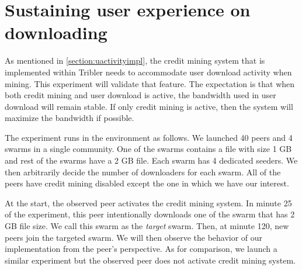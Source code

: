 \vspace{-0.3cm} 
\section{Sustaining user experience on downloading}
\label{section:expprio}
As mentioned in \ref{section:uactivityimpl}, the credit mining system that is implemented within Tribler needs to accommodate user download activity when mining. This experiment will validate that feature. The expectation is that when both credit mining and user download is active, the bandwidth used in user download will remain stable. If only credit mining is active, then the system will maximize the bandwidth if possible. 

The experiment runs in the environment as follows. We launched 40 peers and 4 swarms in a single community. One of the swarms contains a file with size 1 GB and rest of the swarms have a 2 GB file. Each swarm has 4 dedicated seeders. We then arbitrarily decide the number of downloaders for each swarm. All of the peers have credit mining disabled except the one in which we have our interest. 

At the start, the observed peer activates the credit mining system. In minute 25 of the experiment, this peer intentionally downloads one of the swarm that has 2 GB file size. We call this swarm as the \textit{target} swarm. Then, at minute 120, new peers join the targeted swarm. We will then observe the behavior of our implementation from the peer's perspective. As for comparison, we launch a similar experiment but the observed peer does not activate credit mining system. 

